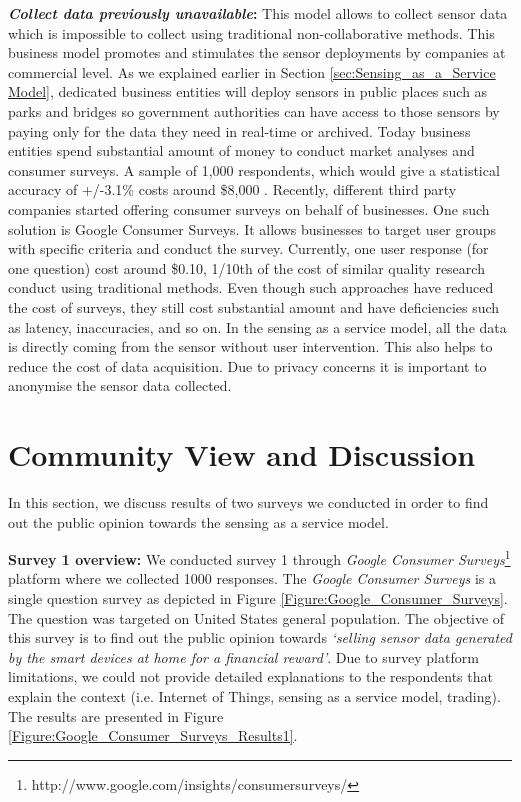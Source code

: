 \documentclass[conference]{IEEEtran}
\begin{document}
 \textbf{\textit{Collect data previously unavailable}:} This model allows to collect sensor data which is impossible to collect using traditional non-collaborative methods. This business model promotes and stimulates the sensor deployments by companies at commercial level. As we explained earlier in Section \ref{sec:Sensing_as_a_Service Model}, dedicated business entities will deploy sensors in public places such as parks and bridges so  government authorities can have access to those sensors by paying only for the data they need in real-time or archived. Today business entities spend substantial amount of money to conduct market analyses and consumer surveys. A sample of 1,000 respondents, which would give a statistical accuracy of +/-3.1\% costs around \$8,000 \cite{P632}. Recently, different third party companies started offering consumer surveys on behalf of businesses. One such solution is Google Consumer Surveys. It allows businesses to target user groups with specific criteria and conduct the survey. Currently, one user response (for one question) cost around \$0.10, 1/10th of the cost of similar quality research conduct using traditional methods. Even though such approaches have reduced the cost of surveys, they still cost substantial amount and have deficiencies such as latency, inaccuracies, and so on. In the sensing as a service model, all the data is directly coming from the sensor without user intervention. This also helps to reduce the cost of data acquisition. Due to privacy concerns it is important to anonymise the sensor data collected. 
 











\section{Community View and Discussion}
\label{sec:Discussion}

In this section, we discuss results of two surveys we conducted in order  to find out the public opinion towards the sensing as a service model.

\textbf{Survey 1 overview:}  We conducted survey 1 through \textit{Google Consumer Surveys}\footnote{http://www.google.com/insights/consumersurveys/} platform where we collected 1000 responses. The \textit{Google Consumer Surveys} is a single question survey as  depicted in Figure \ref{Figure:Google_Consumer_Surveys}. The question was targeted on United States general population. The objective of this survey is to find out the public opinion towards \textit{`selling sensor data generated by the smart devices at home for a financial reward'}. Due to survey platform limitations, we could not provide detailed explanations to the respondents that explain the context (i.e. Internet of Things, sensing as a service model, trading). The results are presented in Figure \ref{Figure:Google_Consumer_Surveys_Results1}.
\end{document}

